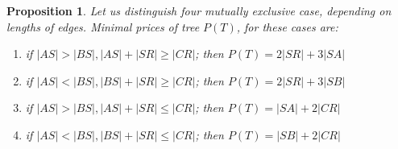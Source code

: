 \documentclass[12pt]{article}
\newcommand{\Ptotal}[1]{P(#1)}
\newtheorem{proposition}{Proposition}
\begin{document}
	\begin{proposition}\label{prop:tp} 
		Let us distinguish four mutually exclusive case, depending on lengths of edges. Minimal prices of tree \(\Ptotal{T}\), for these cases are:
		\begin{enumerate}
		\item if \( |AS| > |BS|, |AS|+|SR| \geq |CR| \); then \(\Ptotal{T} = 2 |SR| + 3 |SA|\)
		\item if \( |AS| < |BS|, |BS|+|SR| \geq |CR| \); then \(\Ptotal{T} = 2 |SR| + 3 |SB|\)
		\item if \( |AS| > |BS|, |AS|+|SR| \leq |CR| \); then \(\Ptotal{T} = |SA| + 2 |CR|\)
		\item if \( |AS| < |BS|, |BS|+|SR| \leq |CR| \); then \(\Ptotal{T} = |SB| + 2 |CR|\)
		\end{enumerate}
	\end{proposition}
\end{document}
